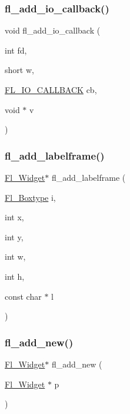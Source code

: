 \subsubsection{\texorpdfstring{fl\+\_\+add\+\_\+io\+\_\+callback()}{fl\_add\_io\_callback()}}
{\footnotesize\ttfamily void fl\+\_\+add\+\_\+io\+\_\+callback (\begin{DoxyParamCaption}\item[{int}]{fd,  }\item[{short}]{w,  }\item[{\hyperlink{forms_8_h_aeb392ff48e699b0f1508e16bd4f9f788}{F\+L\+\_\+\+I\+O\+\_\+\+C\+A\+L\+L\+B\+A\+CK}}]{cb,  }\item[{void $\ast$}]{v }\end{DoxyParamCaption})\hspace{0.3cm}{\ttfamily [inline]}}

\mbox{\label{forms_8_h_ac556ad3943d9136f6abe849b50a025bf}} 
\subsubsection{\texorpdfstring{fl\+\_\+add\+\_\+labelframe()}{fl\_add\_labelframe()}}
{\footnotesize\ttfamily \hyperlink{class_fl___widget}{Fl\+\_\+\+Widget}$\ast$ fl\+\_\+add\+\_\+labelframe (\begin{DoxyParamCaption}\item[{\hyperlink{_enumerations_8_h_ae48bf9070f8541de17829f54ccacc6bc}{Fl\+\_\+\+Boxtype}}]{i,  }\item[{int}]{x,  }\item[{int}]{y,  }\item[{int}]{w,  }\item[{int}]{h,  }\item[{const char $\ast$}]{l }\end{DoxyParamCaption})\hspace{0.3cm}{\ttfamily [inline]}}

\mbox{\label{forms_8_h_a28097874af477fb5cb118aa64fed865a}} 
\subsubsection{\texorpdfstring{fl\+\_\+add\+\_\+new()}{fl\_add\_new()}\hspace{0.1cm}{\footnotesize\ttfamily [1/2]}}
{\footnotesize\ttfamily \hyperlink{class_fl___widget}{Fl\+\_\+\+Widget}$\ast$ fl\+\_\+add\+\_\+new (\begin{DoxyParamCaption}\item[{\hyperlink{class_fl___widget}{Fl\+\_\+\+Widget} $\ast$}]{p }\end{DoxyParamCaption})\hspace{0.3cm}{\ttfamily [inline]}}

